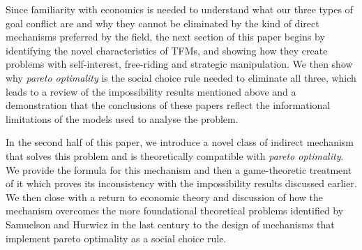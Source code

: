 Since familiarity with economics is needed to understand what our three types of goal conflict are and why they cannot be eliminated by the kind of direct mechanisms preferred by the field, the next section of this paper begins by identifying the novel characteristics of TFMs, and showing how they create problems with self-interest, free-riding and strategic manipulation. We then show why \textit{pareto optimality} is the social choice rule needed to eliminate all three, which leads to a review of the impossibility results mentioned above and a demonstration that the conclusions of these papers reflect the informational limitations of the models used to analyse the problem.

In the second half of this paper, we introduce a novel class of indirect mechanism that solves this problem and is theoretically compatible with \textit{pareto optimality}. We provide the formula for this mechanism and then a game-theoretic treatment of it which proves its inconsistency with the impossibility results discussed earlier. We then close with a return to economic theory and discussion of how the mechanism overcomes the more foundational theoretical problems identified by Samuelson and Hurwicz in the last century to the design of mechanisms that implement pareto optimality as a social choice rule.

